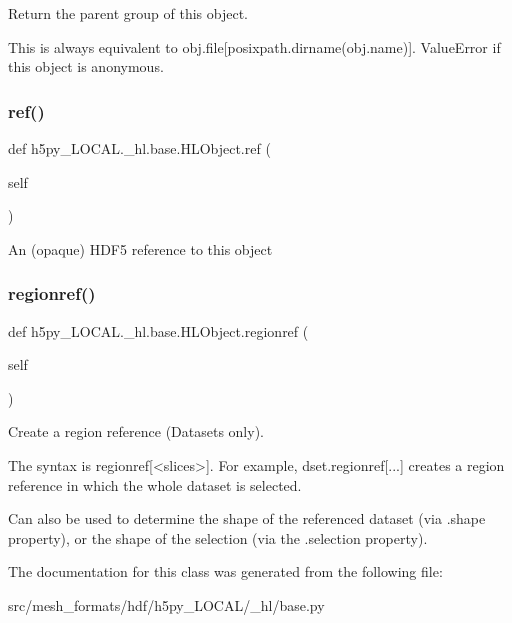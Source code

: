 \begin{DoxyVerb}Return the parent group of this object.

This is always equivalent to obj.file[posixpath.dirname(obj.name)].
ValueError if this object is anonymous.
\end{DoxyVerb}
 \mbox{\label{classh5py__LOCAL_1_1__hl_1_1base_1_1HLObject_a2516a991ac2e9e076aff158a952aaf69}} 
\subsubsection{\texorpdfstring{ref()}{ref()}}
{\footnotesize\ttfamily def h5py\+\_\+\+L\+O\+C\+A\+L.\+\_\+hl.\+base.\+H\+L\+Object.\+ref (\begin{DoxyParamCaption}\item[{}]{self }\end{DoxyParamCaption})}

\begin{DoxyVerb}An (opaque) HDF5 reference to this object \end{DoxyVerb}
 \mbox{\label{classh5py__LOCAL_1_1__hl_1_1base_1_1HLObject_a876b715896fcf09cea653a69ba8a5db4}} 
\subsubsection{\texorpdfstring{regionref()}{regionref()}}
{\footnotesize\ttfamily def h5py\+\_\+\+L\+O\+C\+A\+L.\+\_\+hl.\+base.\+H\+L\+Object.\+regionref (\begin{DoxyParamCaption}\item[{}]{self }\end{DoxyParamCaption})}

\begin{DoxyVerb}Create a region reference (Datasets only).

The syntax is regionref[<slices>]. For example, dset.regionref[...]
creates a region reference in which the whole dataset is selected.

Can also be used to determine the shape of the referenced dataset
(via .shape property), or the shape of the selection (via the
.selection property).
\end{DoxyVerb}
 

The documentation for this class was generated from the following file\+:\begin{DoxyCompactItemize}
\item 
src/mesh\+\_\+formats/hdf/h5py\+\_\+\+L\+O\+C\+A\+L/\+\_\+hl/base.\+py\end{DoxyCompactItemize}
